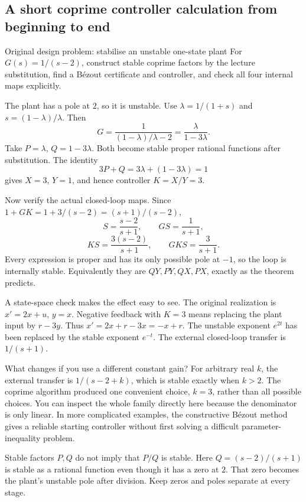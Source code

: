 \subsection{A short coprime controller calculation from beginning to end}
\begin{question}{Original design problem: stabilise an unstable one-state plant}
For $G(s)=1/(s-2)$, construct stable coprime factors by the lecture substitution, find a B\'ezout certificate and controller, and check all four internal maps explicitly.
\end{question}
\begin{answer}
The plant has a pole at $2$, so it is unstable. Use $\lambda=1/(1+s)$ and $s=(1-\lambda)/\lambda$. Then
\[G=\frac1{(1-\lambda)/\lambda-2}=\frac\lambda{1-3\lambda}.\]
Take $P=\lambda$, $Q=1-3\lambda$. Both become stable proper rational functions after substitution. The identity
\[3P+Q=3\lambda+(1-3\lambda)=1\]
gives $X=3$, $Y=1$, and hence controller $K=X/Y=3$.

Now verify the actual closed-loop maps. Since $1+GK=1+3/(s-2)=(s+1)/(s-2)$,
\[S=\frac{s-2}{s+1},\qquad GS=\frac1{s+1},\]
\[KS=\frac{3(s-2)}{s+1},\qquad GKS=\frac3{s+1}.\]
Every expression is proper and has its only possible pole at $-1$, so the loop is internally stable. Equivalently they are $QY,PY,QX,PX$, exactly as the theorem predicts.

A state-space check makes the effect easy to see. The original realization is $x'=2x+u$, $y=x$. Negative feedback with $K=3$ means replacing the plant input by $r-3y$. Thus $x'=2x+r-3x=-x+r$. The unstable exponent $e^{2t}$ has been replaced by the stable exponent $e^{-t}$. The external closed-loop transfer is $1/(s+1)$.
\end{answer}
\begin{concept}{What changes if you use a different constant gain?}
For arbitrary real $k$, the external transfer is $1/(s-2+k)$, which is stable exactly when $k>2$. The coprime algorithm produced one convenient choice, $k=3$, rather than all possible choices. You can inspect the whole family directly here because the denominator is only linear. In more complicated examples, the constructive B\'ezout method gives a reliable starting controller without first solving a difficult parameter-inequality problem.
\end{concept}
\begin{tip}
Stable factors $P,Q$ do not imply that $P/Q$ is stable. Here $Q=(s-2)/(s+1)$ is stable as a rational function even though it has a zero at $2$. That zero becomes the plant's unstable pole after division. Keep zeros and poles separate at every stage.
\end{tip}

